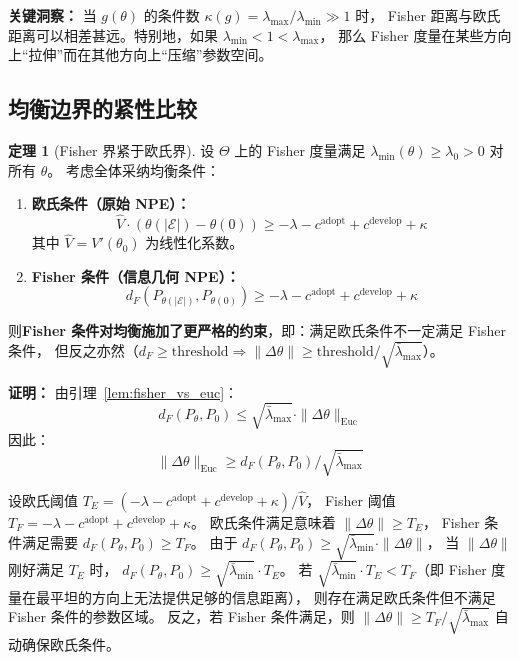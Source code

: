 \documentclass[12pt,a4paper]{article}
\theoremstyle{definition}
\newtheorem{theorem}{定理}[section]
\theoremstyle{remark}
\newcommand{\Fisher}{g}
\begin{document}
\textbf{关键洞察：} 当 $\Fisher(\theta)$ 的条件数 $\kappa(\Fisher) = \lambda_{\max} / \lambda_{\min} \gg 1$ 时，
Fisher 距离与欧氏距离可以相差甚远。特别地，如果 $\lambda_{\min} < 1 < \lambda_{\max}$，
那么 Fisher 度量在某些方向上“拉伸”而在其他方向上“压缩”参数空间。

\subsection{均衡边界的紧性比较}

\begin{theorem}[Fisher 界紧于欧氏界]\label{thm:tighter_bound}
设 $\Theta$ 上的 Fisher 度量满足 $\lambda_{\min}(\theta) \geq \lambda_0 > 0$ 对所有 $\theta$。
考虑全体采纳均衡条件：

\begin{enumerate}[label=(\alph*)]
    \item \textbf{欧氏条件（原始 NPE）：}
    \begin{equation}
        \hat{V} \cdot (\theta(|\mathcal{E}|) - \theta(0)) \geq -\lambda - c^{\text{adopt}} + c^{\text{develop}} + \kappa \label{eq:euc_condition}
    \end{equation}
    其中 $\hat{V} = V'(\theta_0)$ 为线性化系数。

    \item \textbf{Fisher 条件（信息几何 NPE）：}
    \begin{equation}
        d_F(P_{\theta(|\mathcal{E}|)}, P_{\theta(0)}) \geq -\lambda - c^{\text{adopt}} + c^{\text{develop}} + \kappa \label{eq:fisher_condition}
    \end{equation}
\end{enumerate}

则\textbf{Fisher 条件对均衡施加了更严格的约束}，即：满足欧氏条件不一定满足 Fisher 条件，
但反之亦然（$d_F \geq \text{threshold} \Rightarrow \|\Delta\theta\| \geq \text{threshold}/\sqrt{\bar{\lambda}_{\max}}$）。

\textbf{证明：} 由引理~\ref{lem:fisher_vs_euc}：
\begin{equation}
    d_F(P_\theta, P_0) \leq \sqrt{\bar{\lambda}_{\max}} \cdot \|\Delta\theta\|_{\text{Euc}}
\end{equation}
因此：
\begin{equation}
    \|\Delta\theta\|_{\text{Euc}} \geq d_F(P_\theta, P_0) / \sqrt{\bar{\lambda}_{\max}}
\end{equation}

设欧氏阈值 $T_E = (-\lambda - c^{\text{adopt}} + c^{\text{develop}} + \kappa)/\hat{V}$，
Fisher 阈值 $T_F = -\lambda - c^{\text{adopt}} + c^{\text{develop}} + \kappa$。
欧氏条件满足意味着 $\|\Delta\theta\| \geq T_E$，
Fisher 条件满足需要 $d_F(P_\theta, P_0) \geq T_F$。
由于 $d_F(P_\theta, P_0) \geq \sqrt{\bar{\lambda}_{\min}} \cdot \|\Delta\theta\|$，
当 $\|\Delta\theta\|$ 刚好满足 $T_E$ 时，
$d_F(P_\theta, P_0) \geq \sqrt{\bar{\lambda}_{\min}} \cdot T_E$。
若 $\sqrt{\bar{\lambda}_{\min}} \cdot T_E < T_F$（即 Fisher 度量在最平坦的方向上无法提供足够的信息距离），
则存在满足欧氏条件但不满足 Fisher 条件的参数区域。
反之，若 Fisher 条件满足，则 $\|\Delta\theta\| \geq T_F / \sqrt{\bar{\lambda}_{\max}}$ 自动确保欧氏条件。


\end{theorem}
\end{document}
